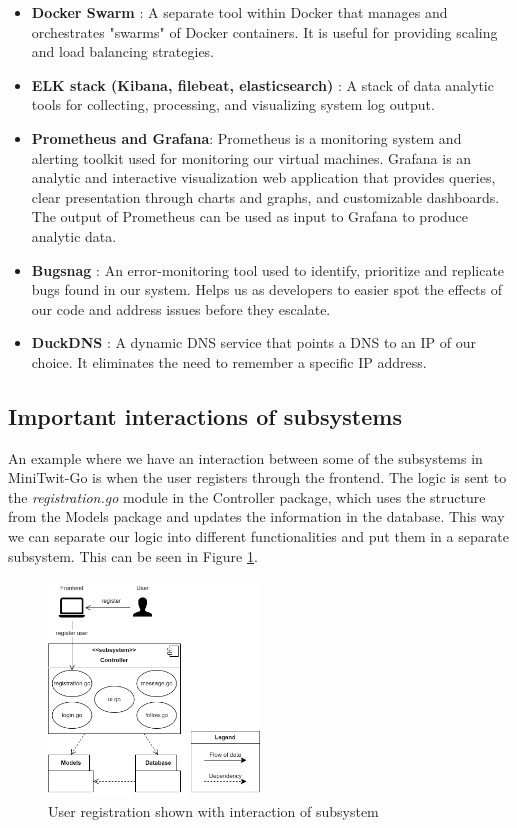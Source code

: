 \begin{itemize}
    \item \textbf{Docker Swarm} \cite{dockerSwarm}: A separate tool within Docker that manages and orchestrates "swarms" of Docker containers. It is useful for providing scaling and load balancing strategies.
    \item \textbf{ELK stack (Kibana, filebeat, elasticsearch)} \cite{elkStack}: A stack of data analytic tools for collecting, processing, and visualizing system log output.
    \item \textbf{Prometheus and Grafana}: Prometheus \cite{prometheus} is a monitoring system and alerting toolkit used for monitoring our virtual machines. Grafana \cite{grafana} is an analytic and interactive visualization web application that provides queries, clear presentation through charts and graphs, and customizable dashboards. The output of Prometheus can be used as input to Grafana to produce analytic data.
    \item \textbf{Bugsnag} \cite{bugsnag}: An error-monitoring tool used to identify, prioritize and replicate bugs found in our system. Helps us as developers to easier spot the effects of our code and address issues before they escalate.
    \item \textbf{DuckDNS} \cite{duckDNS}: A dynamic DNS service that points a DNS to an IP of our choice. It eliminates the need to remember a specific IP address.
\end{itemize}

\subsection{Important interactions of subsystems}   

An example where we have an interaction between some of the subsystems in MiniTwit-Go is when the user registers through the frontend. The logic is sent to the \textit{registration.go} module in the Controller package, which uses the structure from the Models package and updates the information in the database. This way we can separate our logic into different functionalities and put them in a separate subsystem. This can be seen in Figure \ref{fig:subsysteminteraction}. 

\begin{figure}[ht]
		\centering
		\includegraphics[width=0.5\textwidth]{images/subsysteminteraction.png}
		\caption{User registration shown with interaction of subsystem}
		\label{fig:subsysteminteraction}
\end{figure}

